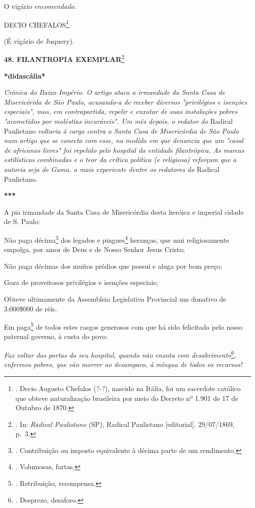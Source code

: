 O vigário \emph{encomendado}.

DECIO CHEFALOS\footnote{. Decio Augusto Chefalos (?-?), nascido na
  Itália, foi um sacerdote católico que obteve naturalização brasileira
  por meio do Decreto nº 1.901 de 17 de Outubro de 1870.}.

(É vigário de Juquery).

\textbf{48. FILANTROPIA EXEMPLAR}\footnote{. In: \emph{Radical
  Paulistano} (SP), Radical Paulistano {[}editorial{]}, 29/07/1869,
  p.~3.}

\textbf{*didascália*}

\emph{Crônica do Baixo Império. O artigo ataca a irmandade da Santa Casa
de Misericórida de São Paulo, acusando-a de receber diversos
"privilégios e isenções especiais", mas, em contrapartida, repelir e
enxotar de suas instalações pobres "acometidos por moléstias
incuráveis". Um mês depois, o redator do} Radical Paulistano
\emph{voltaria à carga contra a Santa Casa de Misericórdia de São Paulo
num artigo que se conecta com esse, na medida em que denuncia que um
"casal de africanos livres" foi repelido pelo hospital da entidade
filantrópica. As marcas estilísticas combinadas e o teor da crítica
política (e religiosa) reforçam que a autoria seja de Gama, o mais
experiente dentre os redatores do} Radical Paulistano\emph{.}

\textbf{***}

A pia irmandade da Santa Casa de Misericórdia desta heróica e imperial
cidade de S. Paulo:

Não paga décima\footnote{. Contribuição ou imposto equivalente à décima
  parte de um rendimento.} dos legados e pingues\footnote{. Volumosas,
  fartas.} heranças, que mui religiosamente empolga, por amor de Deus e
de Nosso Senhor Jesus Cristo;

Não paga décimas dos muitos prédios que possui e aluga por bom preço;

Goza de proveitosos privilégios e isenções especiais;

Obteve ultimamente da Assembleia Legislativa Provincial um donativo de
3:000\$000 de réis.

Em paga\footnote{. Retribuição, recompensa.} de todos estes rasgos
generosos com que há sido felicitada pelo nosso paternal governo, à
custa do povo:

\emph{Faz voltar das portas do seu hospital, quando não enxota com
desabrimento}\footnote{. Desprezo, desaforo.}\emph{,} \emph{enfermos
pobres, que vão morrer ao desamparo, à míngua de todos os recursos!}

